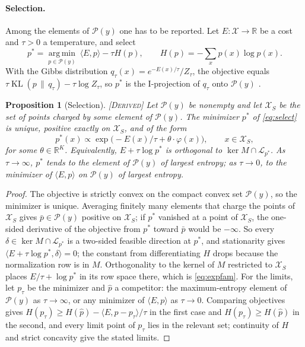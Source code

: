\documentclass[11pt]{article}
\theoremstyle{boldplain}
\newtheorem{proposition}[lemma]{Proposition}
\theoremstyle{boldupright}
\newcommand{\derived}{[\textup{\textsc{Derived}}]}
\newcommand{\Xs}{\mathcal{X}}
\newcommand{\Pc}{\mathcal{P}}
\newcommand{\KL}{\operatorname{KL}}
\begin{document}
\paragraph{Selection.} Among the elements of $\Pc(y)$ one has to be reported. Let $E:\Xs\to\mathbb{R}$ be a cost and $\tau>0$
a temperature, and select
\begin{equation}\label{eq:select}
p^*=\operatorname*{arg\,min}_{p\in\Pc(y)}\ \langle E,p\rangle-\tau H(p),\qquad H(p)=-\sum_xp(x)\log p(x).
\end{equation}
With the Gibbs distribution $q_\tau(x)=e^{-E(x)/\tau}/Z_\tau$, the objective equals $\tau\KL(p\,\|\,q_\tau)-\tau\log Z_\tau$, so $p^*$ is
the I-projection of $q_\tau$ onto $\Pc(y)$ \cite{csiszar1975}.

\begin{proposition}[Selection]\label{prop:select}
\derived{} Let $\Pc(y)$ be nonempty and let $\Xs_S$ be the set of points charged by some element
of $\Pc(y)$. The minimizer $p^*$ of \eqref{eq:select} is unique, positive exactly on $\Xs_S$, and of the form
\begin{equation}\label{eq:expfam}
p^*(x)\propto\exp\bigl(-E(x)/\tau+\theta\cdot\varphi(x)\bigr),\qquad x\in\Xs_S,
\end{equation}
for some $\theta\in\mathbb{R}^K$. Equivalently, $E+\tau\log p^*$ is orthogonal to $\ker M\cap\mathcal{L}_{p^*}$. As $\tau\to\infty$, $p^*$ tends to
the element of $\Pc(y)$ of largest entropy; as $\tau\to0$, to the minimizer of $\langle E,p\rangle$ on $\Pc(y)$ of largest entropy.
\end{proposition}

\begin{proof}
The objective is strictly convex on the compact convex set $\Pc(y)$, so the minimizer is unique.
Averaging finitely many elements that charge the points of $\Xs_S$ gives $\bar p\in\Pc(y)$ positive on $\Xs_S$; if $p^*$
vanished at a point of $\Xs_S$, the one-sided derivative of the objective from $p^*$ toward $\bar p$ would be $-\infty$.
So every $\delta\in\ker M\cap\mathcal{L}_{p^*}$ is a two-sided feasible direction at $p^*$, and stationarity gives
$\langle E+\tau\log p^*,\delta\rangle=0$; the constant from differentiating $H$ drops because the normalization row is in $M$.
Orthogonality to the kernel of $M$ restricted to $\Xs_S$ places $E/\tau+\log p^*$ in its row space there, which is
\eqref{eq:expfam}. For the limits, let $p_\tau$ be the minimizer and $\hat p$ a competitor: the maximum-entropy element of
$\Pc(y)$ as $\tau\to\infty$, or any minimizer of $\langle E,p\rangle$ as $\tau\to0$. Comparing objectives gives
$H(p_\tau)\ge H(\hat p)-\langle E,\hat p-p_\tau\rangle/\tau$ in the first case and $H(p_\tau)\ge H(\hat p)$ in the second, and every
limit point of $p_\tau$ lies in the relevant set; continuity of $H$ and strict concavity give the stated limits.
\end{proof}
\end{document}
